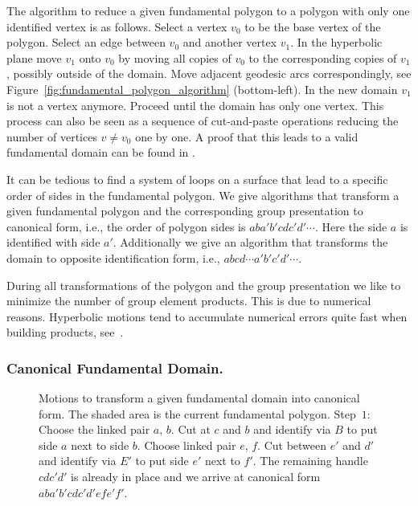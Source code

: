 \documentclass[Thesis]{subfiles}
\begin{document}
The algorithm to reduce a given fundamental polygon to a polygon with only one identified vertex is as follows. Select a vertex $v_0$ to be the base vertex of the polygon. Select an edge between $v_0$ and another vertex $v_1$. In the hyperbolic plane move $v_1$ onto $v_0$ by moving all copies of $v_0$ to the corresponding copies of $v_1$, possibly outside of the domain. Move adjacent geodesic arcs correspondingly, see Figure~\ref{fig:fundamental_polygon_algorithm} (bottom-left). In the new domain $v_1$ is not a vertex anymore. Proceed until the domain has only one vertex. This process can also be seen as a sequence of cut-and-paste operations reducing the number of vertices $v\neq v_0$ one by one. A proof that this leads to a valid fundamental domain can be found in \cite[p. 48]{Jost2007}.

It can be tedious to find a system of loops on a surface that lead to a specific order of sides in the fundamental polygon. We give algorithms that transform a given fundamental polygon and the corresponding group presentation to canonical form, i.e., the order of polygon sides is $aba'b'cdc'd'\cdots$. Here the side $a$ is identified with side $a'$. Additionally we give an algorithm that transforms the domain to opposite identification form, i.e., $abcd\cdots a'b'c'd'\cdots$.

During all transformations of the polygon and the group presentation we like to minimize the number of group element products. This is due to numerical reasons. Hyperbolic motions tend to accumulate numerical errors quite fast when building products, see~\cite{Floyd2002}.

\subsubsection*{Canonical Fundamental Domain.}

\begin{figure}
\centering
{}
\caption{Motions to transform a given fundamental domain into canonical form. The shaded area is the current fundamental polygon. Step~$1$: Choose the linked pair $a$, $b$. Cut at $c$ and $b$ and identify via $B$ to put side $a$ next to side $b$. Choose linked pair $e$, $f$. Cut between $e'$ and $d'$ and identify via $E'$ to put side $e'$ next to $f'$. The remaining handle $cdc'd'$ is already in place and we arrive at canonical form $aba'b'cdc'd'efe'f'$.}
\label{fig:canonical_algorithm}
\end{figure}
\end{document}
